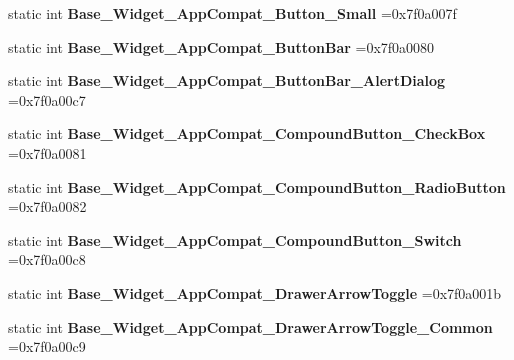 \begin{DoxyCompactItemize}
static int {\bfseries Base\+\_\+\+Widget\+\_\+\+App\+Compat\+\_\+\+Button\+\_\+\+Small} =0x7f0a007f
\item 
\mbox{\label{classandroid_1_1support_1_1v4_1_1R_1_1style_a345130b152b6d0e7841fe6789de1ca4a}} 
static int {\bfseries Base\+\_\+\+Widget\+\_\+\+App\+Compat\+\_\+\+Button\+Bar} =0x7f0a0080
\item 
\mbox{\label{classandroid_1_1support_1_1v4_1_1R_1_1style_a742c1be0bb796dba822ab5658c467255}} 
static int {\bfseries Base\+\_\+\+Widget\+\_\+\+App\+Compat\+\_\+\+Button\+Bar\+\_\+\+Alert\+Dialog} =0x7f0a00c7
\item 
\mbox{\label{classandroid_1_1support_1_1v4_1_1R_1_1style_aadd327d9761ff020176530731a075dd8}} 
static int {\bfseries Base\+\_\+\+Widget\+\_\+\+App\+Compat\+\_\+\+Compound\+Button\+\_\+\+Check\+Box} =0x7f0a0081
\item 
\mbox{\label{classandroid_1_1support_1_1v4_1_1R_1_1style_a4aa4e5c1657de071cb6f398884f4ec46}} 
static int {\bfseries Base\+\_\+\+Widget\+\_\+\+App\+Compat\+\_\+\+Compound\+Button\+\_\+\+Radio\+Button} =0x7f0a0082
\item 
\mbox{\label{classandroid_1_1support_1_1v4_1_1R_1_1style_a6fcf165f1616d73f23f472e82dc77046}} 
static int {\bfseries Base\+\_\+\+Widget\+\_\+\+App\+Compat\+\_\+\+Compound\+Button\+\_\+\+Switch} =0x7f0a00c8
\item 
\mbox{\label{classandroid_1_1support_1_1v4_1_1R_1_1style_a8c1ed6fed20bb073bc2906e17ecbd1af}} 
static int {\bfseries Base\+\_\+\+Widget\+\_\+\+App\+Compat\+\_\+\+Drawer\+Arrow\+Toggle} =0x7f0a001b
\item 
\mbox{\label{classandroid_1_1support_1_1v4_1_1R_1_1style_aa0a401567a948feb89191887d51771b1}} 
static int {\bfseries Base\+\_\+\+Widget\+\_\+\+App\+Compat\+\_\+\+Drawer\+Arrow\+Toggle\+\_\+\+Common} =0x7f0a00c9
\item 
\mbox{\label{classandroid_1_1support_1_1v4_1_1R_1_1style_a99c46f51f7fc157f9a11678230bdaefd}} 

\end{DoxyCompactItemize}

